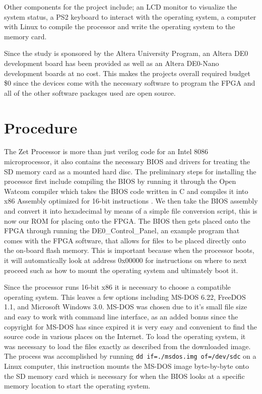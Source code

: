 \documentclass[conference]{IEEEtran}
\begin{document}
Other components for the project include; an LCD monitor to visualize the system status, a PS2 keyboard to interact with the operating system, a computer with Linux to compile the processor and write the operating system to the memory card.

Since the study is sponsored by the Altera University Program, an Altera DE0 development board has been provided as well as an Altera DE0-Nano development boards at no cost. This makes the projects overall required budget \$0 since the devices come with the necessary software to program the FPGA and all of the other software packages used are open source.

\section{Procedure}
The Zet Processor is more than just verilog code for an Intel 8086 microprocessor, it also contains the necessary BIOS and drivers for treating the SD memory card as a mounted hard disc. The preliminary steps for installing the processor first include compiling the BIOS by running it through the Open Watcom compiler which takes the BIOS code written in C and compiles it into x86 Assembly optimized for 16-bit instructions \cite{Watcom}. We then take the BIOS assembly and convert it into hexadecimal by means of a simple file conversion script, this is now our ROM for placing onto the FPGA. The BIOS then gets placed onto the FPGA through running the DE0\_Control\_Panel, an example program that comes with the FPGA software, that allows for files to be placed directly onto the on-board flash memory. This is important because when the processor boots, it will automatically look at address 0x00000 for instructions on where to next proceed such as how to mount the operating system and ultimately boot it. 

Since the processor runs 16-bit x86 it is necessary to choose a compatible operating system. This leaves a few options including MS-DOS 6.22, FreeDOS 1.1, and Microsoft Windows 3.0. MS-DOS was chosen due to it's small file size and easy to work with command line interface, as an added bonus since the copyright for MS-DOS has since expired it is very easy and convenient to find the source code in various places on the Internet. To load the operating system, it was necessary to load the files exactly as described from the downloaded image. The process was accomplished by running {\tt dd if=./msdos.img of=/dev/sdc} on a Linux computer, this instruction mounts the MS-DOS image byte-by-byte onto the SD memory card which is necessary for when the BIOS looks at a specific memory location to start the operating system.
\end{document}
